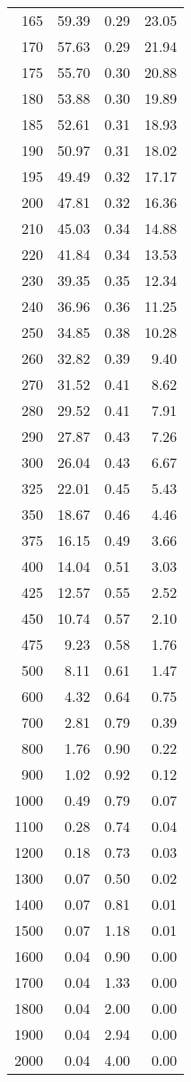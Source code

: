 \begin{table}[ht]
\begin{tabular}{rrrr}
   165 & 59.39 & 0.29 & 23.05 \\ 
   170 & 57.63 & 0.29 & 21.94 \\ 
   175 & 55.70 & 0.30 & 20.88 \\ 
   180 & 53.88 & 0.30 & 19.89 \\ 
   185 & 52.61 & 0.31 & 18.93 \\ 
   190 & 50.97 & 0.31 & 18.02 \\ 
   195 & 49.49 & 0.32 & 17.17 \\ 
   200 & 47.81 & 0.32 & 16.36 \\ 
   210 & 45.03 & 0.34 & 14.88 \\ 
   220 & 41.84 & 0.34 & 13.53 \\ 
   230 & 39.35 & 0.35 & 12.34 \\ 
   240 & 36.96 & 0.36 & 11.25 \\ 
   250 & 34.85 & 0.38 & 10.28 \\ 
   260 & 32.82 & 0.39 & 9.40 \\ 
   270 & 31.52 & 0.41 & 8.62 \\ 
   280 & 29.52 & 0.41 & 7.91 \\ 
   290 & 27.87 & 0.43 & 7.26 \\ 
   300 & 26.04 & 0.43 & 6.67 \\ 
   325 & 22.01 & 0.45 & 5.43 \\ 
   350 & 18.67 & 0.46 & 4.46 \\ 
   375 & 16.15 & 0.49 & 3.66 \\ 
   400 & 14.04 & 0.51 & 3.03 \\ 
   425 & 12.57 & 0.55 & 2.52 \\ 
   450 & 10.74 & 0.57 & 2.10 \\ 
   475 & 9.23 & 0.58 & 1.76 \\ 
   500 & 8.11 & 0.61 & 1.47 \\ 
   600 & 4.32 & 0.64 & 0.75 \\ 
   700 & 2.81 & 0.79 & 0.39 \\ 
   800 & 1.76 & 0.90 & 0.22 \\ 
   900 & 1.02 & 0.92 & 0.12 \\ 
  1000 & 0.49 & 0.79 & 0.07 \\ 
  1100 & 0.28 & 0.74 & 0.04 \\ 
  1200 & 0.18 & 0.73 & 0.03 \\ 
  1300 & 0.07 & 0.50 & 0.02 \\ 
  1400 & 0.07 & 0.81 & 0.01 \\ 
  1500 & 0.07 & 1.18 & 0.01 \\ 
  1600 & 0.04 & 0.90 & 0.00 \\ 
  1700 & 0.04 & 1.33 & 0.00 \\ 
  1800 & 0.04 & 2.00 & 0.00 \\ 
  1900 & 0.04 & 2.94 & 0.00 \\ 
  2000 & 0.04 & 4.00 & 0.00 \\ 
   \hline
\end{tabular}
\end{table}
